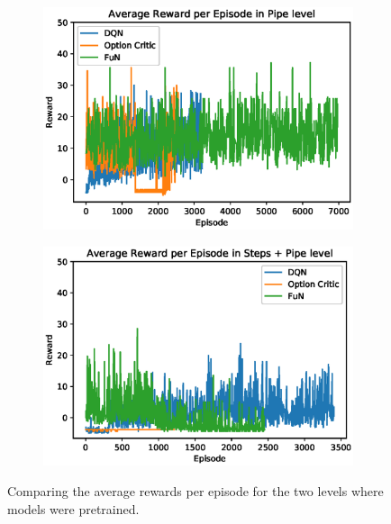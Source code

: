 \documentclass[notitlepage,a4paper,11pt]{article}
\begin{document}
\begin{figure}[htb!]
     \centering
     \begin{subfigure}[t]{0.48\textwidth}
         \centering
         \includegraphics[width=\textwidth]{figs/all_results_1.eps}
         \caption{}
         \label{fig:all_results_1}
     \end{subfigure}
     \hfill
     \begin{subfigure}[t]{0.48\textwidth}
         \centering
         \includegraphics[width=\textwidth]{figs/all_results_2.eps}
         \caption{}
         \label{fig:fun_results_2}
     \end{subfigure}
     \hfill
        \caption{Comparing the average rewards per episode for the two levels where models were pretrained.}
        \label{fig:all_results}
       
\end{figure}
\end{document}
